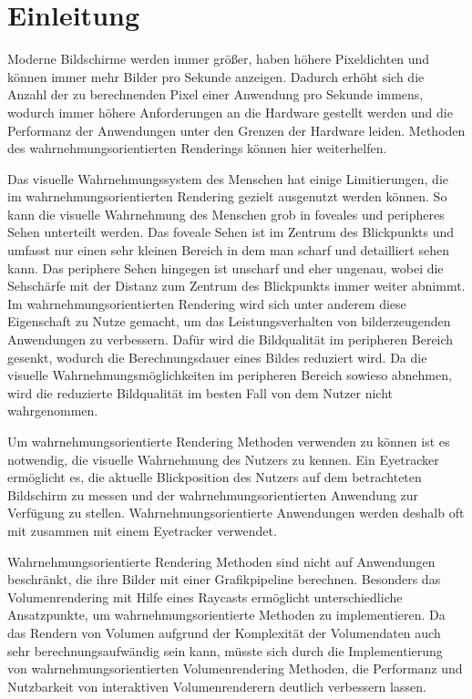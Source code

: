 \chapter{Einleitung}\label{chap::intro}
Moderne Bildschirme werden immer größer, haben höhere Pixeldichten und können immer mehr Bilder pro Sekunde anzeigen.
Dadurch erhöht sich die Anzahl der zu berechnenden Pixel einer Anwendung pro Sekunde immens, wodurch immer höhere Anforderungen an die Hardware gestellt werden und die Performanz der Anwendungen unter den Grenzen der Hardware leiden. 
Methoden des wahrnehmungsorientierten Renderings können hier weiterhelfen. 

Das visuelle Wahrnehmungssystem des Menschen hat einige Limitierungen, die im wahrnehmungsorientierten Rendering gezielt ausgenutzt werden können.
So kann die visuelle Wahrnehmung des Menschen grob in foveales und peripheres Sehen unterteilt werden.
Das foveale Sehen ist im Zentrum des Blickpunkts und umfasst nur einen sehr kleinen Bereich in dem man scharf und detailliert sehen kann.
Das periphere Sehen hingegen ist unscharf und eher ungenau, wobei die Sehschärfe mit der Distanz zum Zentrum des Blickpunkts immer weiter abnimmt.
Im wahrnehmungsorientierten Rendering wird sich unter anderem diese Eigenschaft zu Nutze gemacht, um das Leistungsverhalten von bilderzeugenden Anwendungen zu verbessern.
Dafür wird die Bildqualität im peripheren Bereich gesenkt, wodurch die Berechnungsdauer eines Bildes reduziert wird.
Da die visuelle Wahrnehmungsmöglichkeiten im peripheren Bereich sowieso abnehmen, wird die reduzierte Bildqualität im besten Fall von dem Nutzer nicht wahrgenommen.

Um wahrnehmungsorientierte Rendering Methoden verwenden zu können ist es notwendig, die visuelle Wahrnehmung des Nutzers zu kennen.
Ein Eyetracker ermöglicht es, die aktuelle Blickposition des Nutzers auf dem betrachteten Bildschirm zu messen und der wahrnehmungsorientierten Anwendung zur Verfügung zu stellen.
Wahrnehmungsorientierte Anwendungen werden deshalb oft mit zusammen mit einem Eyetracker verwendet.

Wahrnehmungsorientierte Rendering Methoden sind nicht auf Anwendungen beschränkt, die ihre Bilder mit einer Grafikpipeline berechnen.
Besonders das Volumenrendering mit Hilfe eines Raycasts ermöglicht unterschiedliche Ansatzpunkte, um wahrnehmungsorientierte Methoden zu implementieren.
Da das Rendern von Volumen aufgrund der Komplexität der Volumendaten auch sehr berechnungsaufwändig sein kann, müsste sich durch die Implementierung von wahrnehmungsorientierten Volumenrendering Methoden, die Performanz und Nutzbarkeit von interaktiven Volumenrenderern deutlich verbessern lassen.

